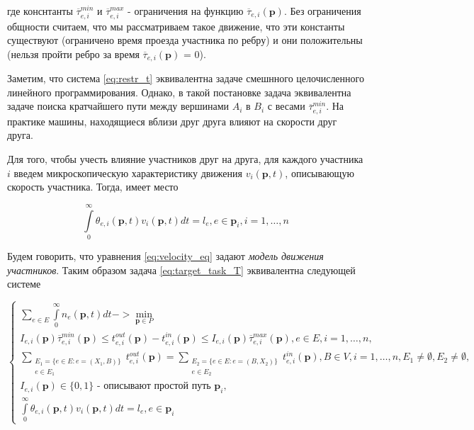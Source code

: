 \documentclass[12pt, a4paper]{article}
\DeclareMathOperator*{\minn}{min}
\begin{document}

где конснтанты $\overline{\tau}_{e, i}^{min}$ и $\overline{\tau}_{e, i}^{max}$ - ограничения на функцию $\overline{\tau}_{e, i} (\textbf{p})$. Без ограничения общности считаем, что мы рассматриваем такое движение, что эти константы существуют (ограничено время проезда участника по ребру) и они положительны (нельзя пройти ребро за время $\overline{\tau}_{e, i} (\textbf{p})$ = 0).

Заметим, что система \eqref{eq:restr_t} эквивалентна задаче смешнного целочисленного линейного программирования. Однако, в такой постановке задача эквивалентна задаче поиска кратчайшего пути между вершинами $A_i$ в $B_i$ с весами $\overline{\tau}_{e, i}^{min}$. На практике машины, находящиеся вблизи друг друга влияют на скорости друг друга.

Для того, чтобы учесть влияние участников друг на друга, для каждого участника $i$ введем микроскопическую характеристику движения $v_i(\textbf{p}, t)$, описывающую скорость участника.
Тогда, имеет место

\begin{equation}
\label{eq:velocity_eq}
\int\limits_{0}^{\infty} \theta_{e, i} (\textbf{p}, t) v_i(\textbf{p}, t) dt = l_e, e \in \textbf{p}_i, i = 1, \dots, n
\end{equation}

Будем говорить, что уравнения \eqref{eq:velocity_eq} задают \textit{модель движения участников}. Таким образом задача \eqref{eq:target_task_T} эквивалентна следующей системе

\begin{equation}
\label{eq:target_task_theta_v}
\begin{cases}
	\sum \limits_{e \in E} \int\limits_{0}^{\infty} n_e (\textbf{p}, t)dt -> \minn\limits_{ \textbf{p} \in P}
	\\
	I_{e, i} (\textbf{p}) \overline{\tau}_{e, i}^{min}(\textbf{p}) \le t_{e, i}^{out}(\textbf{p}) - t_{e, i}^{in}(\textbf{p}) \le I_{e, i}(\textbf{p}) \overline{\tau}_{e, i}^{max}(\textbf{p}), e \in E, i = 1, \dots, n,
	\\
	\sum \limits_{ \substack{E_1 = \{ e \in E: e = (X_1, B) \} \\ e \in E_1}} t_{e, i}^{out} (\textbf{p}) = \sum \limits_{ \substack{E_2 = \{ e \in E: e = (B, X_2) \} \\ e \in E_2}} t_{e, i}^{in} (\textbf{p}), B \in V, i = 1, \dots, n, E_1 \ne \emptyset, E_2 \ne \emptyset,
	\\
	I_{e, i} (\textbf{p}) \in \{0, 1\} \text { - описывают простой путь $\textbf{p}_i$},
	\\
	\int\limits_{0}^{\infty} \theta_{e, i} (\textbf{p}, t) v_i(\textbf{p}, t) dt = l_e, e \in \textbf{p}_i
\end{cases}
\end{equation}
\end{document}
